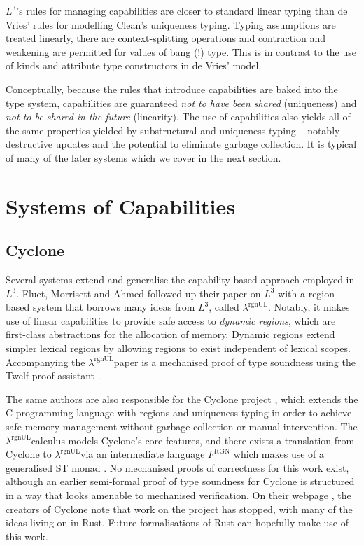 \documentclass[]{unswthesis}
\newcommand{\rgnUL}{$\lambda^\text{rgnUL}$\text{ }}
\let\i\textit
\begin{document}
$L^3$'s rules for managing capabilities are closer to standard linear typing than de Vries' rules for modelling Clean's uniqueness typing. Typing assumptions are treated linearly, there are context-splitting operations and contraction and weakening are permitted for values of bang (!) type. This is in contrast to the use of kinds and attribute type constructors in de Vries' model.

Conceptually, because the rules that introduce capabilities are baked into the type system, capabilities are guaranteed \i{not to have been shared} (uniqueness) and \i{not to be shared in the future} (linearity). The use of capabilities also yields all of the same properties yielded by substructural and uniqueness typing -- notably destructive updates and the potential to eliminate garbage collection. It is typical of many of the later systems which we cover in the next section.

\section{Systems of Capabilities}

\subsection{Cyclone}

Several systems extend and generalise the capability-based approach employed in $L^3$. Fluet, Morrisett and Ahmed followed up their paper on $L^3$ with a region-based system that borrows many ideas from $L^3$, called \rgnUL \cite{fluet06}. Notably, it makes use of linear capabilities to provide safe access to \i{dynamic regions}, which are first-class abstractions for the allocation of memory. Dynamic regions extend simpler lexical regions by allowing regions to exist independent of lexical scopes. Accompanying the \rgnUL paper is a mechanised proof of type soundness using the Twelf proof assistant \cite{pfenning99}.

The same authors are also responsible for the Cyclone project \cite{grossman05}, which extends the C programming language with regions and uniqueness typing in order to achieve safe memory management without garbage collection or manual intervention. The \rgnUL calculus models Cyclone's core features, and there exists a translation from Cyclone to \rgnUL via an intermediate language $F^\text{RGN}$ which makes use of a generalised ST monad \cite{fluet06, fluet04}. No mechanised proofs of correctness for this work exist, although an earlier semi-formal proof of type soundness for Cyclone \cite{jim01} is structured in a way that looks amenable to mechanised verification. On their webpage \cite{cycloneWeb}, the creators of Cyclone note that work on the project has stopped, with many of the ideas living on in Rust. Future formalisations of Rust can hopefully make use of this work.
\end{document}
